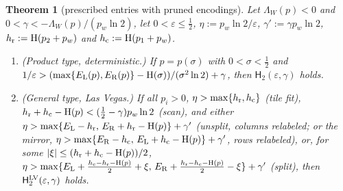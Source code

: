 \documentclass[11pt]{article}
\newtheorem{theorem}{Theorem}[section]
\theoremstyle{definition}
\theoremstyle{remark}
\newcommand{\Hh}{\mathrm{H}}
\newcommand{\Hyp}{\mathsf{H}}
\begin{document}
\begin{theorem}[prescribed entries with pruned encodings]\label{t:thm:pruned}
Let $\Lambda_W(p)<0$ and $0<\gamma<-\Lambda_W(p)/(p_w\ln2)$, let $0<\varepsilon\le\frac12$, $\eta:=p_w\ln2/\varepsilon$, $\gamma':=\gamma p_w\ln2$, $h_{\rm r}:=\Hh(p_2+p_w)$ and $h_{\rm c}:=\Hh(p_1+p_w)$.
\begin{enumerate}[label=(\alph*),nosep]
\item (Product type, deterministic.) If $p=p(\sigma)$ with $0<\sigma<\frac12$ and $1/\varepsilon>(\max\{E_{\rm L}(p),E_{\rm R}(p)\}-\Hh(\sigma))/(\sigma^2\ln2)+\gamma$, then $\Hyp_2(\varepsilon,\gamma)$ holds.
\item (General type, Las Vegas.) If all $p_i>0$, $\eta>\max\{h_{\rm r},h_{\rm c}\}$ (tile fit), $h_{\rm r}+h_{\rm c}-\Hh(p)<(\frac12-\gamma)p_w\ln2$ (scan), and either $\eta>\max\{E_{\rm L}-h_{\rm r},\,E_{\rm R}+h_{\rm r}-\Hh(p)\}+\gamma'$ (unsplit, columns relabeled; or the mirror, $\eta>\max\{E_{\rm R}-h_{\rm c},\,E_{\rm L}+h_{\rm c}-\Hh(p)\}+\gamma'$, rows relabeled), or, for some $|\xi|\le(h_{\rm r}+h_{\rm c}-\Hh(p))/2$, $\eta>\max\{E_{\rm L}+\frac{h_{\rm c}-h_{\rm r}-\Hh(p)}2+\xi,\,E_{\rm R}+\frac{h_{\rm r}-h_{\rm c}-\Hh(p)}2-\xi\}+\gamma'$ (split), then $\Hyp_2^{\rm LV}(\varepsilon,\gamma)$ holds.
\end{enumerate}
\end{theorem}
\end{document}
